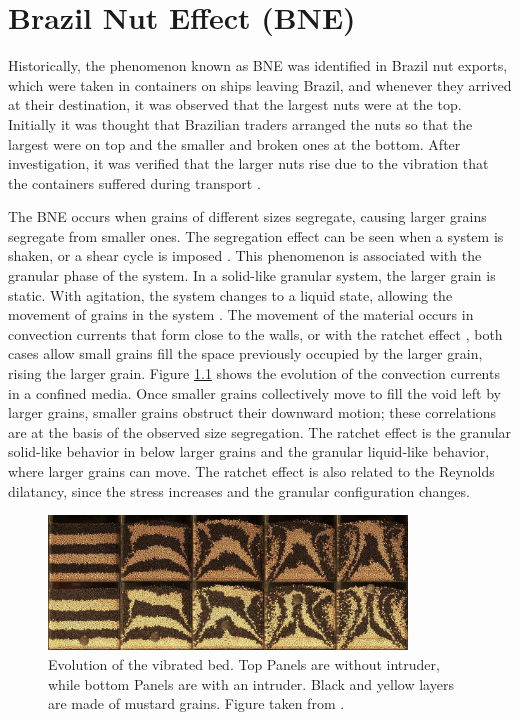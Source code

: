 \chapter{Brazil Nut Effect (BNE)}
\label{chap:BNE}
    Historically, the phenomenon known as BNE was identified in Brazil nut exports, which were taken in containers on ships leaving Brazil, and whenever they arrived at their destination, it was observed that the largest nuts were at the top. Initially it was thought that Brazilian traders arranged the nuts so that the largest were on top and the smaller and broken ones at the bottom. After investigation, it was verified that the larger nuts rise due to the vibration that the containers suffered during transport \cite{Caio-Tese}. 

    The BNE occurs when grains of different sizes segregate, causing larger grains segregate from smaller ones. The segregation effect can be seen when a system is shaken, or a shear cycle is imposed \cite{Granular_Physics}. This phenomenon is associated with the granular phase of the system. In a solid-like granular system, the larger grain is static. With agitation, the system changes to a liquid state, allowing the movement of grains in the system \cite{Why_the_Brazil_nuts_are_on_top}. The movement of the material occurs in convection currents that form close to the walls, or with the ratchet effect \cite{Effects_of_convection_and_friction_on_size_segregation_in_vibrated_granular_beds, Scaling_behavior_in_convection-driven_Brazil-nut_effect, Inertia_in_the_Brazil_nut_problem, The_water-enhance_Brazil_nut_effect}, both cases allow small grains fill the space previously occupied by the larger grain, rising the larger grain. Figure \ref{fig:BNE_hejmady_convection} shows the evolution of the convection currents in a confined media. Once smaller grains collectively move to fill the void left by larger grains, smaller grains obstruct their downward motion; these correlations are at the basis of the observed size segregation. The ratchet effect is the granular solid-like behavior in below larger grains and the granular liquid-like behavior, where larger grains can move. The ratchet effect is also related to the Reynolds dilatancy, since the stress increases and the granular configuration changes.

\begin{figure}[H]
    \centering
    \includegraphics[width=0.85\textwidth]{04-figuras/BNE_Hejmady_Convection.png}
    \caption[Granular convection in vibrated bed.]{Evolution of the vibrated bed. Top Panels are without intruder, while bottom Panels are with an intruder. Black and yellow layers are made of mustard grains. Figure taken from \cite{Scaling_behavior_in_convection-driven_Brazil-nut_effect}.}
    \label{fig:BNE_hejmady_convection}
\end{figure}

